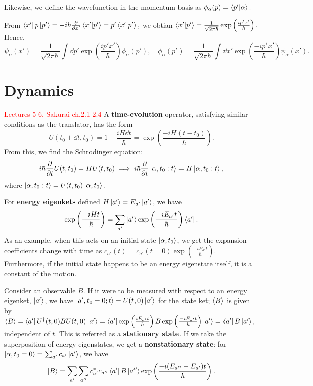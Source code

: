 \documentclass{article}
\begin{document}
Likewise, we define the wavefunction in the momentum basis as $\phi_\alpha(p)=\braket{p'}{\alpha}.$ 

From $\bra{x'}p\ket{p'}=-i\hbar \frac{\partial }{\partial x'}\braket{x'}{p'}=p'\braket{x'}{p'},$ we obtian $\braket{x'}{p'}=\frac 1{\sqrt{2\pi\hbar}}\exp\left(\frac{ip'x'}{\hbar}\right).$ Hence,
$$\psi_\alpha(x')=\frac 1{\sqrt{2\pi\hbar}}\int\dd p'\exp\left(\frac{ip'x'}\hbar\right)\phi_\alpha(p'),\quad\phi_\alpha(p')=\frac 1{\sqrt{2\pi\hbar}}\int\dd x'\exp\left(\frac{-ip'x'}\hbar\right)\psi_\alpha(x').$$

\section{Dynamics}
\textcolor{red}{Lectures 5-6, Sakurai ch.2.1-2.4}
A \textbf{time-evolution} operator, satisfying similar conditions as the translator, has the form $$U(t_0+\dd t,t_0)=1-\frac{iH\dd t}{\hbar}=\exp\left(\frac{-iH(t-t_0)}{\hbar}\right).$$
From this, we find the Schrodinger equation:
$$i\hbar \frac{\partial }{\partial t}U(t,t_0)=HU(t,t_0)\implies i\hbar \frac{\partial }{\partial t}\ket{\alpha,t_0:t}=H\ket{\alpha,t_0:t},$$
where $\ket{\alpha,t_0:t}=U(t,t_0)\ket{\alpha,t_0}.$ 

For \textbf{energy eigenkets} defined $H\ket{a'}=E_{a'}\ket{a'}$, we have 
$$\exp\left(\frac{-iHt}{\hbar}\right)=\sum_{a'}\ket{a'}\exp\left(\frac{-iE_{a'}t}{\hbar}\right)\bra{a'}.$$
As an example, when this acts on an initial state $\ket{\alpha,t_0}$, we get the expansion coefficients change with time as $c_{a'}(t)=c_{a'}(t=0)\exp\left(\frac{-iE_{a'}t}\hbar\right).$ Furthermore, if the initial state happens to be an energy eigenstate itself, it is a constant of the motion. 

Consider an observable $B$. If it were to be measured with respect to an energy eigenket, $\ket{a'}$, we have $\ket{a',t_0=0;t}=U(t,0)\ket{a'}$ for the state ket; $\ev B$ is given by $\ev B=\bra{a'}U^\dag(t,0)BU(t,0)\ket{a'}=\bra{a'}\exp\left(\frac{iE_{a'}t}\hbar\right)B\exp\left(\frac{-iE_{a'}t}\hbar\right)\ket{a'}=\bra{a'}B\ket{a'},$ independent of $t$. This is referred as a \textbf{stationary state}. If we take the superposition of energy eigenstates, we get a \textbf{nonstationary state}: for $\ket{\alpha,t_0=0}=\sum_{a'}c_{a'}\ket{a'}$, we have 
$$\ket B=\sum_{a'}\sum_{a''}c_{a'}^*c_{a''}\bra{a'}B\ket{a''}\exp\left(\frac{-i(E_{a''}-E_{a'})t}\hbar\right).$$
\end{document}
